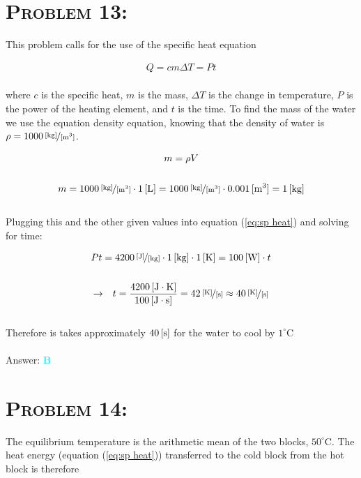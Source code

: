 \documentclass{article}
\begin{document}

\section{\textsc{Problem 13:}} This problem calls for the use of the specific heat equation

\begin{gather}
\label{eq:sp heat} Q = c m \Delta T = P t
\end{gather}
\\
where $c$ is the specific heat, $m$ is the mass, $\Delta T$ is the change in temperature, $P$ is the power of the heating element, and $t$ is the time. To find the mass of the water we use the equation density equation, knowing that the density of water is $\rho = \unitfrac[1000]{[kg]}{[m^{3}]}$.

\begin{gather}
m = \rho V\\
\nonumber\\
m = \unitfrac[1000]{[kg]}{[m^{3}]} \cdot \unit[1]{[L]} = \unitfrac[1000]{[kg]}{[m^{3}]} \cdot \unit[0.001]{[m^{3}]} = \unit[1]{[kg]}\nonumber
\end{gather}
\\
Plugging this and the other given values into equation (\ref{eq:sp heat}) and solving for time:

\begin{gather}
P t = \unitfrac[4200]{[J]}{[kg]} \cdot \unit[1]{[kg]} \cdot \unit[1]{[K]} = \unit[100]{[W]} \cdot t\nonumber\\
\nonumber\\
\rightarrow \hspace{.1in} t = \frac{\unit[4200]{[J \cdot K]}}{\unit[100]{[J \cdot s]}} = \unitfrac[42]{[K]}{[s]}\approx \unitfrac[40]{[K]}{[s]} \nonumber
\end{gather}
\\
Therefore is takes approximately $\unit[40]{[s]}$ for the water to cool by $1^{\circ}$C
\\\\
Answer: \textbf{\textcolor{cyan}B}\\


\section{\textsc{Problem 14:}} The equilibrium temperature is the arithmetic mean of the two blocks, $50^{\circ}$C. The heat energy (equation (\ref{eq:sp heat})) transferred to the cold block from the hot block is therefore
\end{document}
